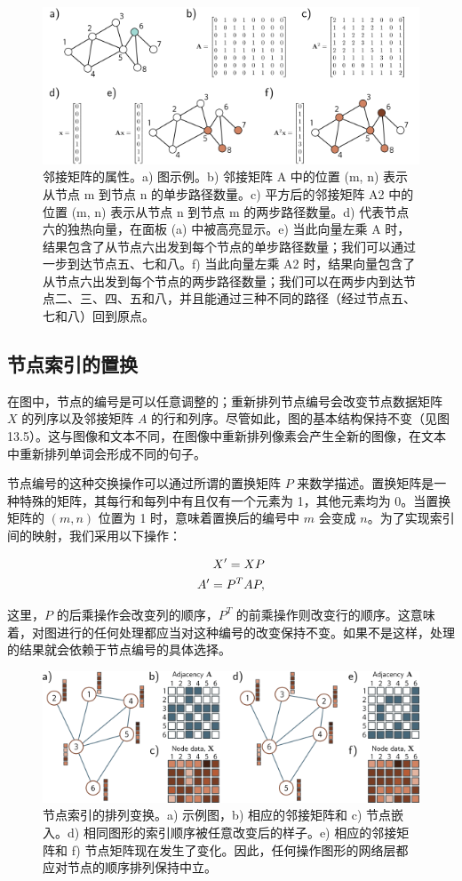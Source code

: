 \begin{figure}[ht!]
\centering
\includegraphics[width=0.7\linewidth]{png/chapter13/GraphAdjacencyMultiply.png}
\caption{邻接矩阵的属性。a) 图示例。b) 邻接矩阵 A 中的位置 (m, n) 表示从节点 m 到节点 n 的单步路径数量。c) 平方后的邻接矩阵 A2 中的位置 (m, n) 表示从节点 n 到节点 m 的两步路径数量。d) 代表节点六的独热向量，在面板 (a) 中被高亮显示。e) 当此向量左乘 A 时，结果包含了从节点六出发到每个节点的单步路径数量；我们可以通过一步到达节点五、七和八。f) 当此向量左乘 A2 时，结果向量包含了从节点六出发到每个节点的两步路径数量；我们可以在两步内到达节点二、三、四、五和八，并且能通过三种不同的路径（经过节点五、七和八）回到原点。}
\end{figure}


\subsection{节点索引的置换}
在图中，节点的编号是可以任意调整的；重新排列节点编号会改变节点数据矩阵 \(X\) 的列序以及邻接矩阵 \(A\) 的行和列序。尽管如此，图的基本结构保持不变（见图 13.5）。这与图像和文本不同，在图像中重新排列像素会产生全新的图像，在文本中重新排列单词会形成不同的句子。

节点编号的这种交换操作可以通过所谓的置换矩阵 \(P\) 来数学描述。置换矩阵是一种特殊的矩阵，其每行和每列中有且仅有一个元素为 1，其他元素均为 0。当置换矩阵的 \((m, n)\) 位置为 1 时，意味着置换后的编号中 \(m\) 会变成 \(n\)。为了实现索引间的映射，我们采用以下操作：


\begin{align}
X' = XP \notag \\
A' = P^TAP, 
\end{align} 


这里，\(P\) 的后乘操作会改变列的顺序，\(P^T\) 的前乘操作则改变行的顺序。这意味着，对图进行的任何处理都应当对这种编号的改变保持不变。如果不是这样，处理的结果就会依赖于节点编号的具体选择。

\begin{figure}[ht!]
\centering
\includegraphics[width=0.7\linewidth]{png/chapter13/GraphNodeEquiv.png}
\caption{节点索引的排列变换。a) 示例图，b) 相应的邻接矩阵和 c) 节点嵌入。d) 相同图形的索引顺序被任意改变后的样子。e) 相应的邻接矩阵和 f) 节点矩阵现在发生了变化。因此，任何操作图形的网络层都应对节点的顺序排列保持中立。}
\end{figure}


